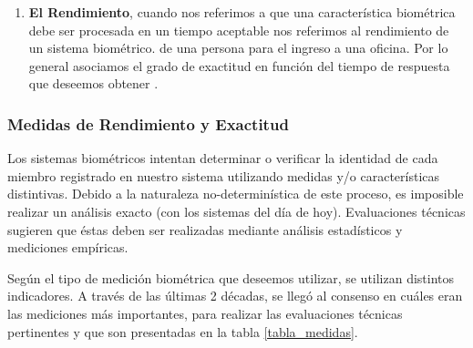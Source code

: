 \begin{enumerate}
\item \textbf{El Rendimiento}, cuando nos referimos a que una característica biométrica debe ser procesada en un tiempo aceptable nos referimos al rendimiento de un sistema biométrico.  de una persona para el ingreso a una oficina. Por lo general asociamos el grado de exactitud en función del tiempo de respuesta que deseemos obtener \cite{Way00}.

\end{enumerate}


\subsubsection{Medidas de Rendimiento y Exactitud}

Los sistemas biométricos intentan determinar o verificar la identidad de cada miembro registrado en nuestro sistema utilizando medidas y/o características distintivas. Debido a la naturaleza no-determinística de este proceso, es imposible realizar un análisis exacto (con los sistemas del día de hoy). Evaluaciones técnicas sugieren que éstas deben ser realizadas mediante análisis estadísticos y mediciones empíricas.

Según el tipo de medición biométrica que deseemos utilizar, se utilizan distintos indicadores. A través de las últimas 2 décadas, se llegó al consenso en cuáles eran las mediciones más importantes, para realizar las evaluaciones técnicas pertinentes \cite{Way99} y que son presentadas en la tabla \ref{tabla_medidas}.



